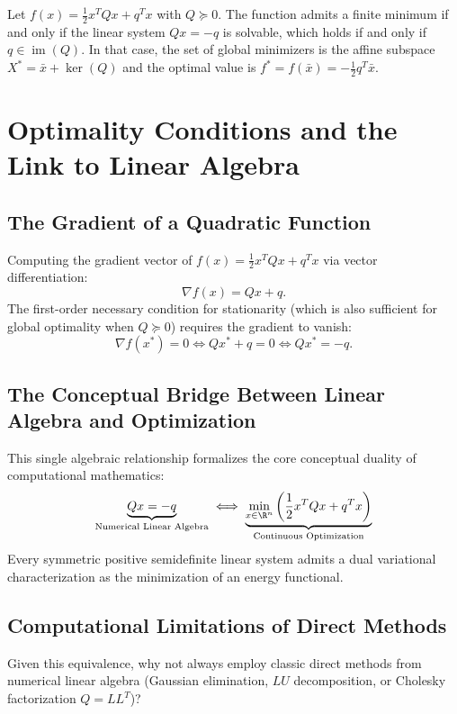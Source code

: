 \begin{theorem}
\label{thm:existence-minimum-psd}
Let $f(x) = \frac{1}{2} x^T Q x + q^T x$ with $Q \succeq 0$. The function admits a finite minimum if and only if the linear system $Qx = -q$ is solvable, which holds if and only if $q \in \operatorname{im}(Q)$.
In that case, the set of global minimizers is the affine subspace $X^* = \bar{x} + \ker(Q)$ and the optimal value is $f^* = f(\bar{x}) = -\frac{1}{2} q^T \bar{x}$.
\end{theorem}


\FloatBarrier
\section{Optimality Conditions and the Link to Linear Algebra}
\label{sec:optimality-conditions-linear-algebra}

\subsection{The Gradient of a Quadratic Function}
Computing the gradient vector of $f(x) = \frac{1}{2} x^T Q x + q^T x$ via vector differentiation:
\begin{equation}
    \nabla f(x) = Qx + q.
\end{equation}
The first-order necessary condition for stationarity (which is also sufficient for global optimality when $Q \succeq 0$) requires the gradient to vanish:
\begin{equation}
    \nabla f(x^*) = 0 \iff Q x^* + q = 0 \iff Q x^* = -q.
\end{equation}

\subsection{The Conceptual Bridge Between Linear Algebra and Optimization}
This single algebraic relationship formalizes the core conceptual duality of computational mathematics:
\begin{equation}
    \underbrace{Qx = -q}_{\text{Numerical Linear Algebra}} \iff \underbrace{\min_{x \in \R^n} \left(\frac{1}{2}x^T Qx + q^T x\right)}_{\text{Continuous Optimization}}
\end{equation}
Every symmetric positive semidefinite linear system admits a dual variational characterization as the minimization of an energy functional.

\subsection{Computational Limitations of Direct Methods}
Given this equivalence, why not always employ classic direct methods from numerical linear algebra (Gaussian elimination, $LU$ decomposition, or Cholesky factorization $Q = L L^T$)?

